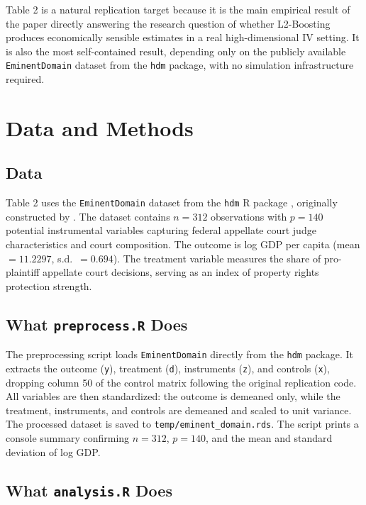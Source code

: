 \documentclass[12pt]{article}
\begin{document}
Table 2 is a natural replication target because it is the main empirical
result of the paper directly answering the research question
of whether L2-Boosting produces economically sensible estimates in a
real high-dimensional IV setting. It is also the most self-contained result,
depending only on the publicly available \texttt{EminentDomain} dataset from
the \texttt{hdm} package, with no simulation infrastructure required.

\section{Data and Methods}

\subsection*{Data}

Table 2 uses the \texttt{EminentDomain} dataset from the \texttt{hdm} R
package \citep{hdm2016}, originally constructed by \citet{belloni2012sparse}. The dataset contains
$n = 312$ observations with $p = 140$ potential instrumental variables
capturing federal appellate court judge characteristics and court composition.
The outcome is log GDP per capita (mean $= 11.2297$, s.d.\ $= 0.694$).
The treatment variable measures the share of pro-plaintiff appellate court
decisions, serving as an index of property rights protection strength.

\subsection*{What \texttt{preprocess.R} Does}

The preprocessing script loads \texttt{EminentDomain} directly from the
\texttt{hdm} package. It extracts the outcome (\texttt{y}), treatment
(\texttt{d}), instruments (\texttt{z}), and controls (\texttt{x}), dropping
column 50 of the control matrix following the original replication code.
All variables are then standardized: the outcome is demeaned only, while
the treatment, instruments, and controls are demeaned and scaled to unit
variance. The processed dataset is saved to \texttt{temp/eminent\_domain.rds}.
The script prints a console summary confirming $n = 312$, $p = 140$, and the
mean and standard deviation of log GDP.

\subsection*{What \texttt{analysis.R} Does}
\end{document}
